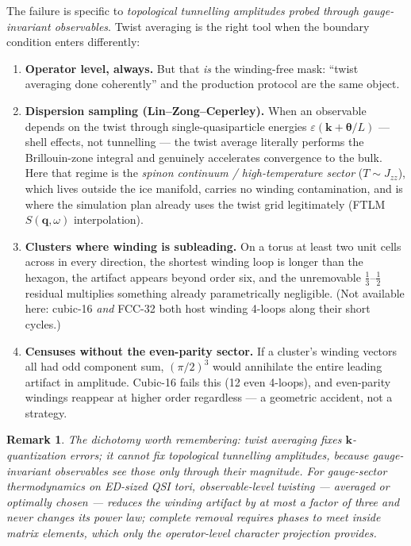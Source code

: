 \documentclass[11pt]{article}
\newtheorem*{remark}{Remark}
\newcommand{\Jzz}{J_{zz}}
\newcommand{\btheta}{\boldsymbol{\theta}}
\begin{document}
The failure is specific to \emph{topological tunnelling amplitudes probed
through gauge-invariant observables}.  Twist averaging is the right tool when
the boundary condition enters differently:
\begin{enumerate}
\item \textbf{Operator level, always.}  But that \emph{is} the winding-free
  mask: ``twist averaging done coherently'' and the production protocol are
  the same object.
\item \textbf{Dispersion sampling (Lin--Zong--Ceperley).}  When an observable
  depends on the twist through single-quasiparticle energies
  $\varepsilon(\mathbf{k}+\btheta/L)$ --- shell effects, not tunnelling ---
  the twist average literally performs the Brillouin-zone integral and
  genuinely accelerates convergence to the bulk.  Here that regime is the
  \emph{spinon continuum / high-temperature sector} ($T\sim\Jzz$), which
  lives outside the ice manifold, carries no winding contamination, and is
  where the simulation plan already uses the twist grid legitimately (FTLM
  $S(\mathbf{q},\omega)$ interpolation).
\item \textbf{Clusters where winding is subleading.}  On a torus at least two
  unit cells across in every direction, the shortest winding loop is longer
  than the hexagon, the artifact appears beyond order six, and the
  unremovable $\tfrac13$--$\tfrac12$ residual multiplies something already
  parametrically negligible.  (Not available here: cubic-16 \emph{and}
  FCC-32 both host winding 4-loops along their short cycles.)
\item \textbf{Censuses without the even-parity sector.}  If a cluster's
  winding vectors all had odd component sum, $(\pi/2)^3$ would annihilate the
  entire leading artifact in amplitude.  Cubic-16 fails this (12 even
  4-loops), and even-parity windings reappear at higher order regardless ---
  a geometric accident, not a strategy.
\end{enumerate}

\begin{remark}
The dichotomy worth remembering: \emph{twist averaging fixes
$\mathbf{k}$-quantization errors; it cannot fix topological tunnelling
amplitudes}, because gauge-invariant observables see those only through their
magnitude.  For gauge-sector thermodynamics on ED-sized QSI tori,
observable-level twisting --- averaged or optimally chosen --- reduces the
winding artifact by at most a factor of three and never changes its power
law; complete removal requires phases to meet \emph{inside} matrix elements,
which only the operator-level character projection provides.
\end{remark}
\end{document}
